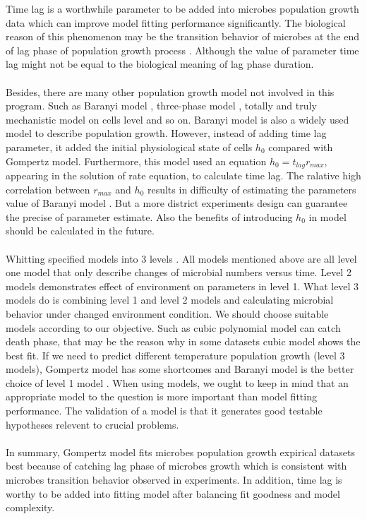 \documentclass[11pt]{article}
\begin{document}
  Time lag is a worthwhile parameter to be added into microbes population growth data which can improve 
  model fitting performance significantly. The biological reason of this phenomenon may be the transition 
  behavior of microbes at the end of lag phase of population growth process \citep{VerhulstA.J2011Aotl}. 
  Although the value of parameter time lag might not be equal to the biological meaning of lag phase duration.\\
  \\
  Besides, there are many other population growth model not involved in this program. Such as Baranyi 
  model \citep{BARANYIJ1993Ande}, three-phase model \citep{BuchananR.L1997Wisg}, 
  totally and truly mechanistic model on cells level \citep{Peleg2011} and so on. Baranyi model is also 
  a widely used model to describe population growth. However, instead of adding time lag parameter, it added 
  the initial physiological state of cells $h_{0}$ compared with Gompertz model. Furthermore, this model used 
  an equation $h_{0} = t_{lag} r_{max}$, appearing in the solution of rate equation, to calculate time lag. 
  The ralative high correlation between $r_{max}$ and $h_{0}$ results in difficulty of estimating the parameters 
  value of Baranyi model \citep{GrijspeerdtK1999Etpo}. But a more district experiments design can guarantee 
  the precise of parameter estimate. Also the benefits of introducing $h_{0}$ in model should 
  be calculated in the future.\\
  \\
  Whitting specified models into 3 levels \citep{Whiting}. All models mentioned above are all level one model 
  that only describe changes of microbial numbers versus time. Level 2 models demonstrates effect of environment 
  on parameters in level 1. What level 3 models do is combining level 1 and level 2 models and calculating 
  microbial behavior under changed environment condition. We should choose suitable models according to our 
  objective. Such as cubic polynomial model can catch death phase, that may be the reason why in some datasets 
  cubic model shows the best fit. If we need to predict different temperature population growth (level 3 models), 
  Gompertz model has some shortcomes and Baranyi model is the better choice of level 1 model \citep{Peleg2011,SILVA2018}. 
  When using models, we ought to keep in mind that an appropriate model to the question is more important 
  than model fitting performance. The validation of a model is that it generates good testable hypotheses 
  relevent to crucial problems.\\
  \\
  In summary, Gompertz model fits microbes population growth expirical datasets best because of catching lag 
  phase of microbes growth which is consistent with microbes transition behavior observed in experiments. 
  In addition, time lag is worthy to be added into fitting model after balancing fit goodness and model complexity.

  
  

  
\end{document}
